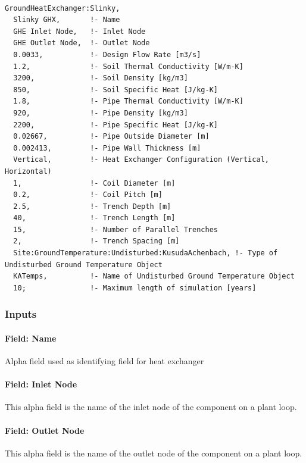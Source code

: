 \begin{lstlisting}

GroundHeatExchanger:Slinky,
  Slinky GHX,       !- Name
  GHE Inlet Node,   !- Inlet Node
  GHE Outlet Node,  !- Outlet Node
  0.0033,           !- Design Flow Rate [m3/s]
  1.2,              !- Soil Thermal Conductivity [W/m-K]
  3200,             !- Soil Density [kg/m3]
  850,              !- Soil Specific Heat [J/kg-K]
  1.8,              !- Pipe Thermal Conductivity [W/m-K]
  920,              !- Pipe Density [kg/m3]
  2200,             !- Pipe Specific Heat [J/kg-K]
  0.02667,          !- Pipe Outside Diameter [m]
  0.002413,         !- Pipe Wall Thickness [m]
  Vertical,         !- Heat Exchanger Configuration (Vertical, Horizontal)
  1,                !- Coil Diameter [m]
  0.2,              !- Coil Pitch [m]
  2.5,              !- Trench Depth [m]
  40,               !- Trench Length [m]
  15,               !- Number of Parallel Trenches
  2,                !- Trench Spacing [m]
  Site:GroundTemperature:Undisturbed:KusudaAchenbach, !- Type of Undisturbed Ground Temperature Object
  KATemps,          !- Name of Undisturbed Ground Temperature Object
  10;               !- Maximum length of simulation [years]
\end{lstlisting}

\subsubsection{Inputs}\label{inputs-11-002}

\paragraph{Field: Name}\label{field-name-10-002}

Alpha field used as identifying field for heat exchanger

\paragraph{Field: Inlet Node}\label{field-inlet-node}

This alpha field is the name of the inlet node of the component on a plant loop.

\paragraph{Field: Outlet Node}\label{field-outlet-node}

This alpha field is the name of the outlet node of the component on a plant loop.

